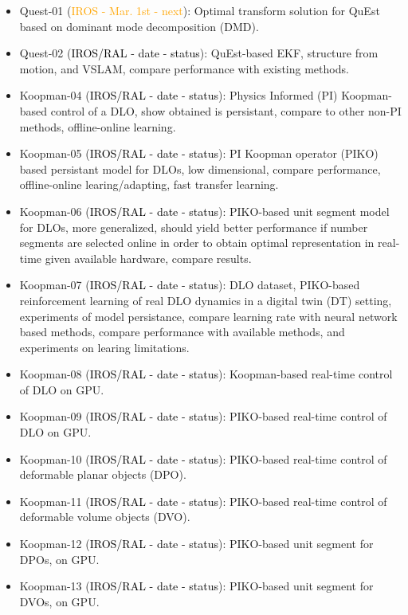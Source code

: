 \documentclass[11pt]{article}
\begin{document}
\begin{itemize}
  \item Quest-01 (\textcolor{orange}{IROS - Mar. 1st - next}):
  Optimal transform solution for QuEst based on dominant mode decomposition (DMD).
  \item Quest-02 (\textcolor{black}{IROS/RAL - date - status}):
  QuEst-based EKF, structure from motion, and VSLAM, compare performance with
  existing methods.
  \item Koopman-04 (\textcolor{black}{IROS/RAL - date - status}):
  Physics Informed (PI) Koopman-based control of a DLO,
  show obtained is persistant, compare to other non-PI methods, offline-online learning.
  \item Koopman-05 (\textcolor{black}{IROS/RAL - date - status}):
  PI Koopman operator (PIKO) based persistant model for DLOs, low dimensional,
  compare performance, offline-online learing/adapting, fast transfer learning.
  \item Koopman-06 (\textcolor{black}{IROS/RAL - date - status}):
  PIKO-based unit segment model for DLOs, more generalized, should yield better
  performance if number segments are selected online in order to
  obtain optimal representation in real-time given available hardware, compare
  results.
  \item Koopman-07 (\textcolor{black}{IROS/RAL - date - status}):
  DLO dataset, PIKO-based reinforcement learning of real DLO dynamics in a
  digital twin (DT) setting,
  experiments of model persistance, compare learning rate
  with neural network based methods, compare performance with available methods,
  and experiments on learing limitations.
  \item Koopman-08 (\textcolor{black}{IROS/RAL - date - status}):
  Koopman-based real-time control of DLO on GPU.
  \item Koopman-09 (\textcolor{black}{IROS/RAL - date - status}):
  PIKO-based real-time control of DLO on GPU.
  \item Koopman-10 (\textcolor{black}{IROS/RAL - date - status}):
  PIKO-based real-time control of deformable planar objects (DPO).
  \item Koopman-11 (\textcolor{black}{IROS/RAL - date - status}):
  PIKO-based real-time control of deformable volume objects (DVO).
  \item Koopman-12 (\textcolor{black}{IROS/RAL - date - status}):
  PIKO-based unit segment for DPOs, on GPU.
  \item Koopman-13 (\textcolor{black}{IROS/RAL - date - status}):
  PIKO-based unit segment for DVOs, on GPU.
\end{itemize}
\end{document}
